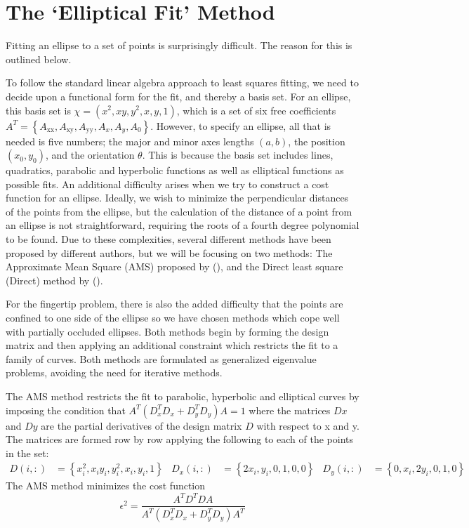 \section{The `Elliptical Fit' Method}\label{sec:EllipticalFitMethod}
Fitting an ellipse to a set of points is surprisingly difficult. The reason for this is outlined below.

To follow the standard linear algebra approach to least squares fitting, we need to decide upon a functional form for the fit, and thereby a basis set. For an ellipse, this basis set is $\chi= \left(x^2, x y, y^2, x, y, 1\right)$, which is a set of six free coefficients $ A^T=\left\{A_{\text{xx}},A_{\text{xy}},A_{\text{yy}},A_x,A_y,A_0\right\}$. However, to specify an ellipse, all that is needed is five numbers; the major and minor axes lengths $(a,b)$, the position $(x_0,y_0)$, and the orientation $\theta$. This is because the basis set includes lines, quadratics, parabolic and hyperbolic functions as well as elliptical functions as possible fits. An additional difficulty arises when we try to construct a cost function for an ellipse. Ideally, we wish to minimize the perpendicular distances of the points from the ellipse, but the calculation of the distance of a point from an ellipse is not straightforward, requiring the roots of a fourth degree polynomial to be found. Due to these complexities, several different methods have been proposed by different authors, but we will be focusing on two methods: The Approximate Mean Square (AMS)  proposed by (\cite{Taubin1991}), and the Direct least square (Direct) method by (\cite{Fitzgibbon1999}).


For the fingertip problem, there is also the added difficulty that the points are confined to one side of the ellipse so we have chosen methods which cope well with partially occluded ellipses. Both methods begin by forming the design matrix and then applying an additional constraint which restricts the fit to a family of curves. Both methods are formulated as generalized eigenvalue problems, avoiding the need for iterative methods.

The AMS method restricts the fit to parabolic, hyperbolic and elliptical curves by imposing the condition that $ A^T ( D_x^T D_x  +   D_y^T D_y) A = 1$ where the matrices $Dx$ and $Dy$ are the partial derivatives of the design matrix $D$ with respect to x and y. The matrices are formed row by row applying the following to each of the points in the set:
\begin{align*}
D(i,:)&=\left\{x_i^2, x_i y_i, y_i^2, x_i, y_i, 1\right\} &
D_x(i,:)&=\left\{2 x_i,y_i,0,1,0,0\right\} &
D_y(i,:)&=\left\{0,x_i,2 y_i,0,1,0\right\}
\end{align*}
The AMS method minimizes the cost function
\begin{equation*}
\epsilon ^2=\frac{ A^T D^T D A }{ A^T (D_x^T D_x +  D_y^T D_y) A^T }
\end{equation*}

